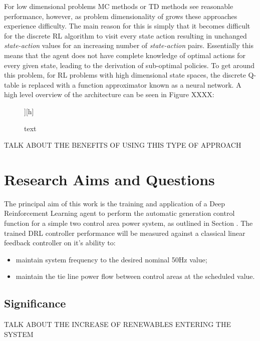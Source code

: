 \documentclass[12pt, a4paper]{article}
\begin{document}
For low dimensional problems MC methods or TD methods see reasonable performance, however, as problem dimensionality of grows these approaches experience difficulty. The main reason for this is simply that it becomes difficult for the discrete RL algorithm to visit every state action resulting in unchanged \textit{state-action} values for an increasing number of \textit{state-action} pairs. Essentially this means that the agent does not have complete knowledge of optimal actions for every given state, leading to the derivation of sub-optimal policies. To get around this problem, for RL problems with high dimensional state spaces, the discrete Q-table is replaced with a function approximator known as a neural network. A high level overview of the architecture can be seen in Figure XXXX:
\begin{figure}][h]
\centering
\caption{text}
\end{figure}



TALK ABOUT THE BENEFITS OF USING THIS TYPE OF APPROACH





\section{Research Aims and Questions}

The principal aim of this work is the training and application of a Deep Reinforcement Learning agent to perform the automatic generation control function for a simple two control area power system, as outlined in Section . The trained DRL controller performance will be measured against a classical linear feedback controller on it's ability to:
\begin{itemize}
	\item maintain system frequency to the desired nominal 50$\si{\hertz}$ value;
	\item maintain the tie line power flow between control areas at the scheduled value.
\end{itemize}




\subsection{Significance}

TALK ABOUT THE INCREASE OF RENEWABLES ENTERING THE SYSTEM
\end{document}
